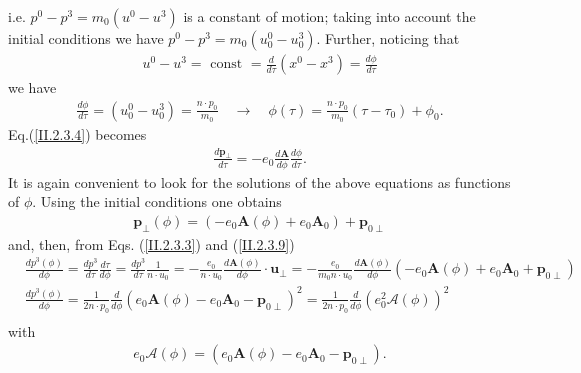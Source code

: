 i.e. $p^{0}-p^{3}=m_{0}\left(u^{0}-u^{3}\right)$ is a constant of motion; taking into account the initial conditions we have $p^{0}-p^{3}=m_{0}\left(u_{0}^{0}-u_{0}^{3}\right)$. Further, noticing that
\begin{align}
  u^{0}-u^{3}=\text { const }=\frac{d}{d \tau}\left(x^{0}-x^{3}\right)=\frac{d \phi}{d \tau} \label{II.2.3.6}
\end{align}
we have
\begin{align}
  \frac{d \phi}{d \tau}=\left(u_{0}^{0}-u_{0}^{3}\right)=\frac{n \cdot p_{0}}{m_{0}} \quad \longrightarrow \quad \phi(\tau)=\frac{n \cdot p_{0}}{m_{0}}\left(\tau-\tau_{0}\right)+\phi_{0} . \label{II.2.3.7}
\end{align}
Eq.(\ref{II.2.3.4}) becomes
\begin{align}
  \frac{d \mathbf{p}_{\perp}}{d \tau}=-e_{0} \frac{d \mathbf{A}}{d \phi} \frac{d \phi}{d \tau} . \label{II.2.3.8}
\end{align}
It is again convenient to look for the solutions of the above equations as functions of $\phi$. Using the initial conditions one obtains
\begin{align}
  \mathbf{p}_{\perp}(\phi)=\left(-e_{0} \mathbf{A}(\phi)+e_{0} \mathbf{A}_{0}\right)+\mathbf{p}_{0 \perp} \label{II.2.3.9}
\end{align}
and, then, from Eqs. (\ref{II.2.3.3}) and (\ref{II.2.3.9})
\begin{align}
   & \frac{d p^{3}(\phi)}{d \phi}=\frac{d p^{3}}{d \tau} \frac{d \tau}{d \phi}=\frac{d p^{3}}{d \tau} \frac{1}{n \cdot u_{0}}=-\frac{e_{0}}{n \cdot u_{0}} \frac{d \mathbf{A}(\phi)}{d \phi} \cdot \mathbf{u}_{\perp}=-\frac{e_{0}}{m_{0} n \cdot u_{0}} \frac{d \mathbf{A}(\phi)}{d \phi}\left(-e_{0} \mathbf{A}(\phi)+e_{0} \mathbf{A}_{0}+\mathbf{p}_{0 \perp}\right)  \label{II.2.3.10} \\
   & \frac{d p^{3}(\phi)}{d \phi}=\frac{1}{2 n \cdot p_{0}} \frac{d}{d \phi}\left(e_{0} \mathbf{A}(\phi)-e_{0} \mathbf{A}_{0}-\mathbf{p}_{0 \perp}\right)^{2}=\frac{1}{2 n \cdot p_{0}} \frac{d}{d \phi}\left(e_{0}^{2} \boldsymbol{\mathcal { A }}(\phi)\right)^{2} \label{II.2.3.11}                                                                                                      \\
\end{align}
with
\begin{align}
  e_{0} {\boldsymbol{\mathcal{A}}}(\phi)=\left(e_{0} \mathbf{A}(\phi)-e_{0} \mathbf{A}_{0}-\mathbf{p}_{0 \perp}\right) . \label{II.2.3.12}
\end{align}
